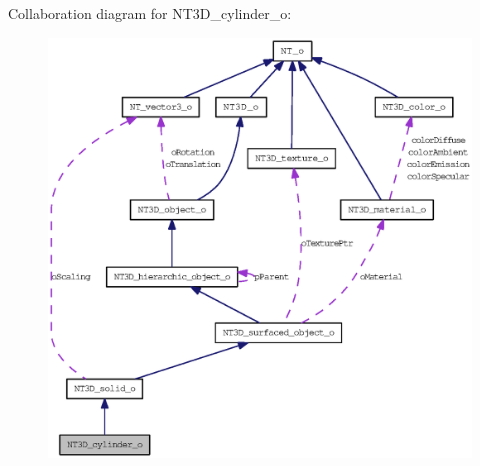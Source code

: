 Collaboration diagram for NT3D\_\-cylinder\_\-o:
\nopagebreak
\begin{figure}[H]
\begin{center}
\leavevmode
\includegraphics[width=400pt]{class_n_t3_d__cylinder__o__coll__graph}
\end{center}
\end{figure}
